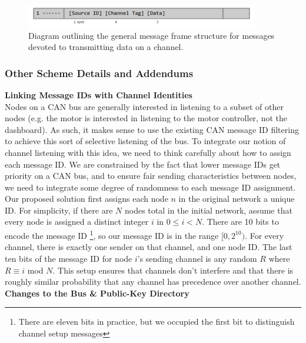 \documentclass{article}
\begin{document}
\begin{figure}[h]
  \centering
  \includegraphics[width=4in]{data-frame}
  \caption {Diagram outlining the general message frame structure for messages devoted to transmitting data on a channel.}
\end{figure} 
    
    \subsubsection{Other Scheme Details and Addendums}
    \textbf{Linking Message IDs with Channel Identities}\\
    
    Nodes on a CAN bus are generally interested in listening to a subset of other nodes (e.g. the motor is interested in listening to the motor controller, not the dashboard). As such, it makes sense to use the existing CAN message ID filtering to achieve this sort of selective listening of the bus. To integrate our notion of channel listening with this idea, we need to think carefully about how to assign each message ID. We are constrained by the fact that lower message IDs get priority on a CAN bus, and to ensure fair sending characteristics between nodes, we need to integrate some degree of randomness to each message ID assignment.\\
    
    Our proposed solution first assigns each node $n$ in the original network a unique ID. For simplicity, if there are $N$ nodes total in the initial network, assume that every node is assigned a distinct integer $i$ in $0\leq i < N$. There are 10 bits to encode the message ID \footnote{There are eleven bits in practice, but we occupied the first bit to distinguish channel setup messages}, so our message ID is in the range $[0,2^{10})$. For every channel, there is exactly one sender on that channel, and one node ID. The last ten bits of the message ID for node $i$'s sending channel is any random $R$ where $R \equiv i$ mod $N$. This setup ensures that channels don't interfere and that there is roughly similar probability that any channel has precedence over another channel.\\
    
    \textbf{Changes to the Bus \& Public-Key Directory} \\
    
\end{document}
